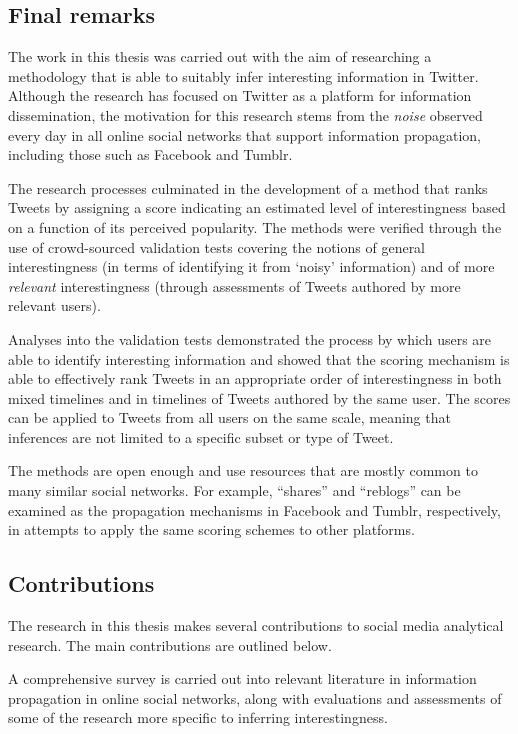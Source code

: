 \subsection{Final remarks}
The work in this thesis was carried out with the aim of researching a methodology that is able to suitably infer interesting information in Twitter. Although the research has focused on Twitter as a platform for information dissemination, the motivation for this research stems from the \textit{noise} observed every day in all online social networks that support information propagation, including those such as Facebook and Tumblr.

The research processes culminated in the development of a method that ranks Tweets by assigning a score indicating an estimated level of interestingness based on a function of its perceived popularity. The methods were verified through the use of crowd-sourced validation tests covering the notions of general interestingness (in terms of identifying it from `noisy' information) and of more \textit{relevant} interestingness (through assessments of Tweets authored by more relevant users).

Analyses into the validation tests demonstrated the process by which users are able to identify interesting information and showed that the scoring mechanism is able to effectively rank Tweets in an appropriate order of interestingness in both mixed timelines and in timelines of Tweets authored by the same user. The scores can be applied to Tweets from all users on the same scale, meaning that inferences are not limited to a specific subset or type of Tweet.

The methods are open enough and use resources that are mostly common to many similar social networks. For example, ``shares'' and ``reblogs'' can be examined as the propagation mechanisms in Facebook and Tumblr, respectively, in attempts to apply the same scoring schemes to other platforms.


\subsection{Contributions}
The research in this thesis makes several contributions to social media analytical research. The main contributions are outlined below.

A comprehensive survey is carried out into relevant literature in information propagation in online social networks, along with evaluations and assessments of some of the research more specific to inferring interestingness.

